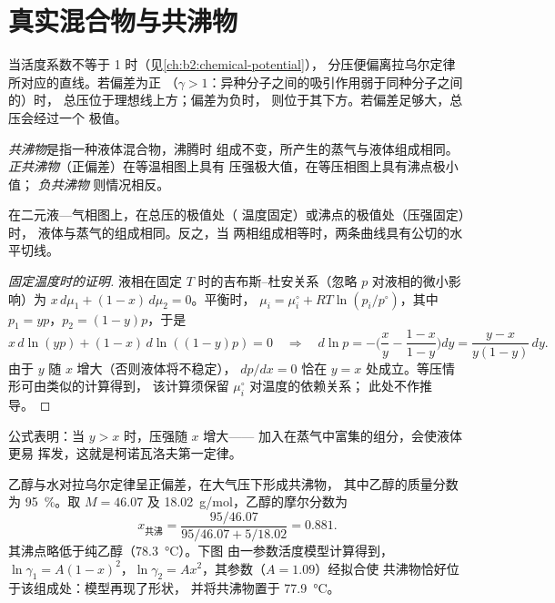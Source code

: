 \section{真实混合物与共沸物}

当活度系数不等于 1 时（见\cref{ch:b2:chemical-potential}），
分压便偏离拉乌尔定律所对应的直线。若偏差为正
（$\gamma > 1$：异种分子之间的吸引作用弱于同种分子之间的）时，
总压位于理想线上方；偏差为负时，
则位于其下方。若偏差足够大，总压会经过一个
极值。

\begin{definition}[共沸物]\label{def:b2:liquid-vapour-diagrams:azeotrope}
\emph{共沸物}是指一种液体混合物，沸腾时
组成不变，所产生的蒸气与液体组成相同。
\emph{正共沸物}（正偏差）在等温相图上具有
压强极大值，在等压相图上具有沸点极小值；
\emph{负共沸物}
则情况相反。
\end{definition}

\begin{theorem}\label{thm:b2:liquid-vapour-diagrams:konovalov}
在二元液—气相图上，在总压的极值处（
温度固定）或沸点的极值处（压强固定）时，
液体与蒸气的组成相同。反之，当
两相组成相等时，两条曲线具有公切的水平切线。
\end{theorem}

\begin{proof}[固定温度时的证明]
液相在固定 $T$ 时的吉布斯–杜安关系（忽略 $p$
对液相的微小影响）为 $x\,d\mu_1 + (1 - x)\,d\mu_2 = 0$。平衡时，
$\mu_i = \mu_i^\circ + RT\ln(p_i/p^\circ)$，其中 $p_1 = yp$，$p_2 = (1 - y)p$，于是
\[
  x\,d\ln(yp) + (1 - x)\,d\ln((1 - y)p) = 0
  \quad\Longrightarrow\quad
  d\ln p = -\Big(\frac{x}{y} - \frac{1 - x}{1 - y}\Big)dy
  = \frac{y - x}{y(1 - y)}\,dy .
\]
由于 $y$ 随 $x$ 增大（否则液体将不稳定），
$dp/dx = 0$ 恰在 $y = x$ 处成立。等压情形可由类似的计算得到，
该计算须保留 $\mu_i^\circ$ 对温度的依赖关系；
此处不作推导。
\end{proof}

公式表明：当 $y > x$ 时，压强随 $x$ 增大——
加入在蒸气中富集的组分，会使液体更易
挥发，这就是柯诺瓦洛夫第一定律。

\begin{example}[乙醇与水]\label{ex:b2:liquid-vapour-diagrams:ethanol-water}
乙醇与水对拉乌尔定律呈正偏差，在大气压下形成共沸物，
其中乙醇的质量分数为 95~\%。取 $M = 46.07$ 及
\qty{18.02}{g/mol}，乙醇的摩尔分数为
\[
  x_{\text{共沸}} = \frac{95/46.07}{95/46.07 + 5/18.02} = 0.881 .
\]
其沸点略低于纯乙醇（\qty{78.3}{\degreeCelsius}）。下图
由一参数活度模型计算得到，$\ln\gamma_1 = A(1 -
x)^2$，$\ln\gamma_2 = Ax^2$，其参数（$A = 1.09$）经拟合使
共沸物恰好位于该组成处：模型再现了形状，
并将共沸物置于 \qty{77.9}{\degreeCelsius}。
\end{example}

